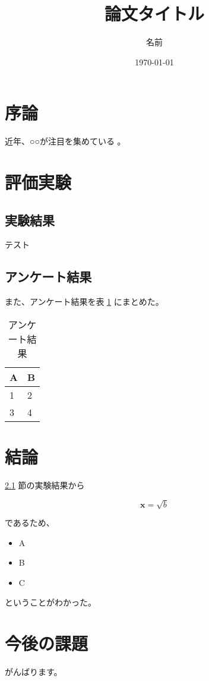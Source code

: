 \documentclass{jarticle}
\author{名前}
\date{\today}
\title{論文タイトル}
\begin{document}
\maketitle


\section{序論}
\label{sec:org8591885}
近年、○○が注目を集めている \cite{abramowitz+stegun} 。

\section{評価実験}
\label{sec:org815156b}
\subsection{実験結果}
\label{sec:orge647154}
テスト

\subsection{アンケート結果}
\label{sec:org4f09623}
また、アンケート結果を表 \ref{tab:orgdc54b11} にまとめた。

\begin{table}[htbp]
\caption{\label{tab:orgdc54b11}
アンケート結果}
\centering
\begin{tabular}{|l|l|}
\hline
A & B\\
\hline
1 & 2\\
3 & 4\\
\hline
\end{tabular}
\end{table}

\section{結論}
\label{sec:orgbb4415f}
\ref{sec:orge647154} 節の実験結果から

\begin{equation}
\bm{x}=\sqrt{b}
\end{equation}

であるため、

\begin{itemize}
\item A
\item B
\item C
\end{itemize}

ということがわかった。

\section{今後の課題}
\label{sec:orgbd2fd10}
がんばります。




\end{document}
